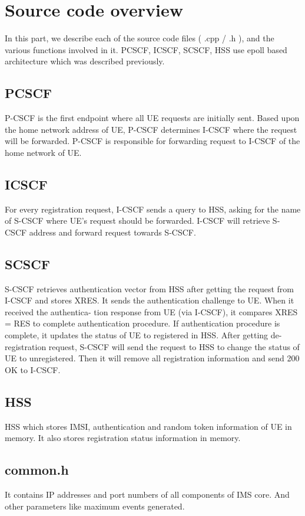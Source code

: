 \documentclass[hidelinks]{report}
\begin{document}
\section*{Source code overview}
In this part, we describe each of the source code files ( .cpp / .h ), and the various functions involved in it.
PCSCF, ICSCF, SCSCF, HSS use epoll based architecture which was described previously.

\subsection*{PCSCF}
P-CSCF is the first endpoint where all UE requests are initially sent. Based upon the home
network address of UE, P-CSCF determines I-CSCF where the request will be forwarded.
P-CSCF is responsible for forwarding request to I-CSCF of the home network of UE.

\subsection*{ICSCF}
For every registration request, I-CSCF sends a query to HSS, asking for the name of S-CSCF
where UE’s request should be forwarded. I-CSCF will retrieve S-CSCF address and forward
request towards S-CSCF. 

\subsection*{SCSCF}
S-CSCF retrieves authentication vector from HSS after getting the request from I-CSCF and
stores XRES. It sends the authentication challenge to UE. When it received the authentica-
tion response from UE (via I-CSCF), it compares XRES = RES to complete authentication
procedure. If authentication procedure is complete, it updates the status of UE to registered
in HSS. After getting de-registration request, S-CSCF will send the request to HSS to change
the status of UE to unregistered. Then it will remove all registration information and send
200 OK to I-CSCF.

\subsection*{HSS}
HSS which stores IMSI, authentication and random token
information of UE in memory. It also stores registration status information in memory.

\subsection*{common.h}
It contains IP addresses and port numbers of all components of IMS core. And other parameters like maximum events generated. 
\end{document}
